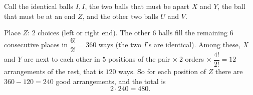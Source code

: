 Call the identical balls $I,I$, the two balls that must be apart $X$ and $Y$, the ball that must be at an end $Z$, and the other two balls $U$ and $V$.

Place $Z$: $2$ choices (left or right end). The other $6$ balls fill the remaining $6$ consecutive places in $\dfrac{6!}{2!}=360$ ways (the two $I$'s are identical). Among these, $X$ and $Y$ are next to each other in $5$ positions of the pair $\times\ 2$ orders $\times\ \dfrac{4!}{2!}=12$ arrangements of the rest, that is $120$ ways. So for each position of $Z$ there are $360-120=240$ good arrangements, and the total is
\[2\cdot240=\boxed{480}.\]
